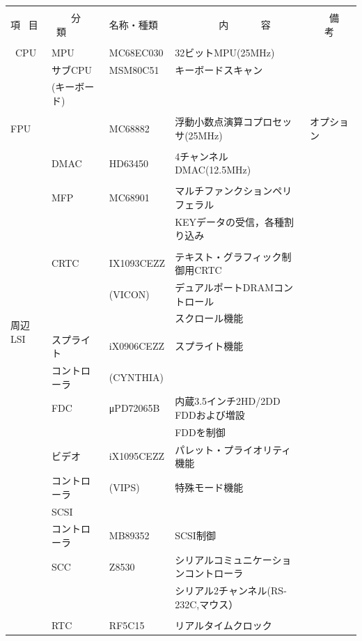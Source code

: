 \documentclass[twoside,a4paper,12pt]{article}
\begin{document}
\setlength{\tabcolsep}{0.5mm}
\begin{tabular}{|p{13mm}|p{25mm}|p{22mm}|p{73mm}|p{30mm}|}
\hline
& & & &\\[-2mm]
項 \ 目& \ \ \ \ 分 \ 類 & \ 名称・種類 & \ \ \ \ \ \ \ \ \ 内 \ \ \ \ \ \ 容 & \ \ \ \ 備 \ \ \ 考\\
\hline
& & & &\\[-3mm]
\ CPU & MPU & \ MC68EC030 & 32ビットMPU(25MHz) &\\
& サブCPU & \ MSM80C51 & キーボードスキャン &\\
& (キーボード) & & &\\
\hline
\multicolumn{2}{|l|}{} & & &\\[-4mm]
\multicolumn{2}{|l|}{FPU} & \ MC68882 & 浮動小数点演算コプロセッサ(25MHz) & オプション\\
\hline
\multirow{17}{13mm}{周辺 LSI} & & & &\\[-3mm]
& DMAC & \ HD63450 & 4チャンネルDMAC(12.5MHz) &\\
\cline{2-5}
& & & &\\[-3mm]
& MFP & \ MC68901 & マルチファンクションペリフェラル &\\
& & & KEYデータの受信，各種割り込み &\\
\cline{2-5}
& & & &\\[-3mm]
& CRTC & \ IX1093CEZZ & テキスト・グラフィック制御用CRTC &\\
& & \ (VICON) & デュアルポートDRAMコントロール &\\
& & & スクロール機能 &\\[3mm]
\cline{2-5}
& & & &\\[-1mm]
& スプライト & \ iX0906CEZZ & スプライト機能 &\\
& コントローラ & \ (CYNTHIA) & &\\
& FDC & \ μPD72065B & 内蔵3.5インチ2HD/2DD FDDおよび増設 &\\
& & & FDDを制御 &\\
& ビデオ & \ iX1095CEZZ & パレット・プライオリティ機能 &\\
& コントローラ & \ (VIPS) & 特殊モード機能 &\\
& SCSI & & &\\
& コントローラ & \ MB89352 & SCSI制御 &\\
& SCC & \ Z8530 & シリアルコミュニケーションコントローラ &\\
& & & シリアル2チャンネル(RS-232C,マウス） &\\
& & & &\\
& RTC & \ RF5C15 & リアルタイムクロック &\\

\end{tabular}
\end{document}

